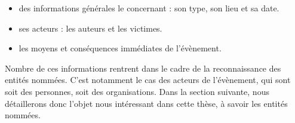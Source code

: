 \documentclass[PhD-Yoann-Dupont.tex]{subfiles}
\begin{document}
\begin{itemize}
    \item des informations générales le concernant : son type, son lieu et sa date.
    \item ses acteurs : les auteurs et les victimes.
    \item les moyens et conséquences immédiates de l'évènement.
\end{itemize}

Nombre de ces informations rentrent dans le cadre de la reconnaissance des entités nommées. C'est notamment le cas des acteurs de l'évènement, qui sont soit des personnes, soit des organisations. Dans la section suivante, nous détaillerons donc l'objet nous intéressant dans cette thèse, à savoir les entités nommées.
\end{document}
